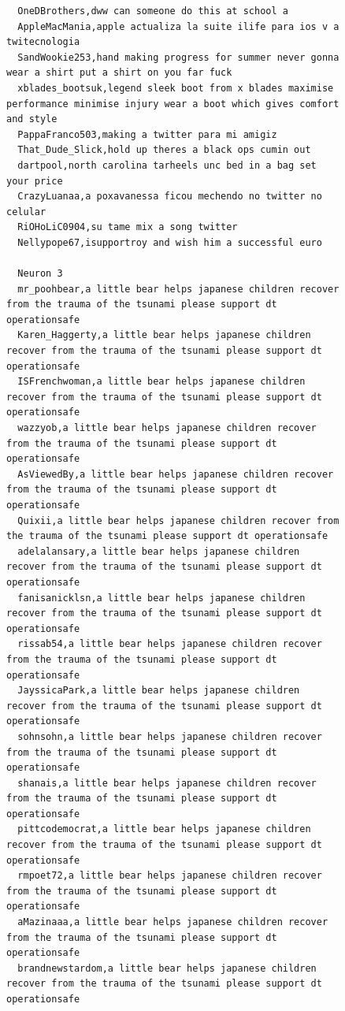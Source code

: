 \begin{figure}[htpb]
\begin{verbatim}
  OneDBrothers,dww can someone do this at school a
  AppleMacMania,apple actualiza la suite ilife para ios v a twitecnologia
  SandWookie253,hand making progress for summer never gonna wear a shirt put a shirt on you far fuck
  xblades_bootsuk,legend sleek boot from x blades maximise performance minimise injury wear a boot which gives comfort and style
  PappaFranco503,making a twitter para mi amigiz
  That_Dude_Slick,hold up theres a black ops cumin out
  dartpool,north carolina tarheels unc bed in a bag set your price
  CrazyLuanaa,a poxavanessa ficou mechendo no twitter no celular
  RiOHoLiC0904,su tame mix a song twitter
  Nellypope67,isupportroy and wish him a successful euro

  Neuron 3
  mr_poohbear,a little bear helps japanese children recover from the trauma of the tsunami please support dt operationsafe
  Karen_Haggerty,a little bear helps japanese children recover from the trauma of the tsunami please support dt operationsafe
  ISFrenchwoman,a little bear helps japanese children recover from the trauma of the tsunami please support dt operationsafe
  wazzyob,a little bear helps japanese children recover from the trauma of the tsunami please support dt operationsafe
  AsViewedBy,a little bear helps japanese children recover from the trauma of the tsunami please support dt operationsafe
  Quixii,a little bear helps japanese children recover from the trauma of the tsunami please support dt operationsafe
  adelalansary,a little bear helps japanese children recover from the trauma of the tsunami please support dt operationsafe
  fanisanicklsn,a little bear helps japanese children recover from the trauma of the tsunami please support dt operationsafe
  rissab54,a little bear helps japanese children recover from the trauma of the tsunami please support dt operationsafe
  JayssicaPark,a little bear helps japanese children recover from the trauma of the tsunami please support dt operationsafe
  sohnsohn,a little bear helps japanese children recover from the trauma of the tsunami please support dt operationsafe
  shanais,a little bear helps japanese children recover from the trauma of the tsunami please support dt operationsafe
  pittcodemocrat,a little bear helps japanese children recover from the trauma of the tsunami please support dt operationsafe
  rmpoet72,a little bear helps japanese children recover from the trauma of the tsunami please support dt operationsafe
  aMazinaaa,a little bear helps japanese children recover from the trauma of the tsunami please support dt operationsafe
  brandnewstardom,a little bear helps japanese children recover from the trauma of the tsunami please support dt operationsafe

\end{verbatim}
\end{figure}
